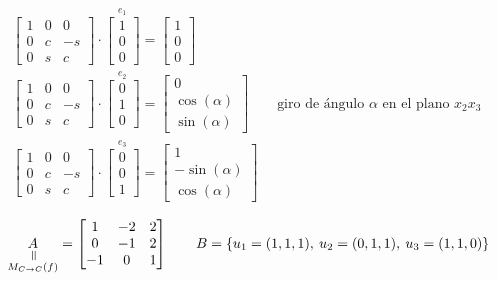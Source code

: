 \begin{enumerate}[label=\color{red}\textbf{\arabic*)}, leftmargin=*]
    $\begin{array}{l}
          \begin{bmatrix}
          1 & 0 & 0 \\
          0 & c & -s \\
          0 & s & c
    \end{bmatrix}\cdot\overset{e_1}{\begin{bmatrix}
    1\\
    0\\
    0
    \end{bmatrix}}=\begin{bmatrix}
    1\\
    0\\
    0
\end{bmatrix}\\
\begin{bmatrix}
      1 & 0 & 0 \\
      0 & c & -s \\
      0 & s & c
\end{bmatrix}\cdot\overset{e_2}{\begin{bmatrix}
            0\\
            1\\
            0
\end{bmatrix}}=\begin{bmatrix}
      0\\
      \cos(\alpha)\\
      \sin(\alpha)
\end{bmatrix}\qquad\text{giro de ángulo $\alpha$ en el plano $x_2x_3$}\\
\begin{bmatrix}
      1 & 0 & 0 \\
      0 & c & -s \\
      0 & s & c
\end{bmatrix}\cdot\overset{e_3}{\begin{bmatrix}
            0\\
            0\\
            1
\end{bmatrix}}=\begin{bmatrix}
      1\\
      -\sin(\alpha)\\
      \cos(\alpha)
\end{bmatrix}
    \end{array}$
    
    $\underset{\begin{subarray}{c}
                \rotatebox{-90}{=}\\
                M_{C\to C}(f)
    \end{subarray}}{A}=\begin{bmatrix}
          1 & -2 & 2\\
          0 & -1 & 2\\
          -1 & 0 & 1
    \end{bmatrix}\qquad B=\{u_1=(1,1,1),\: u_2=(0,1,1),\:u_3=(1,1,0)\}$
    

\end{enumerate}
